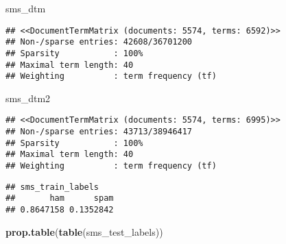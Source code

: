 \documentclass[]{article}
\newenvironment{Shaded}{\begin{snugshade}}{\end{snugshade}}
\newcommand{\KeywordTok}[1]{\textcolor[rgb]{0.13,0.29,0.53}{\textbf{#1}}}
\newcommand{\DecValTok}[1]{\textcolor[rgb]{0.00,0.00,0.81}{#1}}
\newcommand{\OperatorTok}[1]{\textcolor[rgb]{0.81,0.36,0.00}{\textbf{#1}}}
\newcommand{\NormalTok}[1]{#1}
\begin{document}
\begin{Shaded}
\begin{Highlighting}[]
\NormalTok{sms_dtm}
\end{Highlighting}
\end{Shaded}

\begin{verbatim}
## <<DocumentTermMatrix (documents: 5574, terms: 6592)>>
## Non-/sparse entries: 42608/36701200
## Sparsity           : 100%
## Maximal term length: 40
## Weighting          : term frequency (tf)
\end{verbatim}

\begin{Shaded}
\begin{Highlighting}[]
\NormalTok{sms_dtm2}
\end{Highlighting}
\end{Shaded}

\begin{verbatim}
## <<DocumentTermMatrix (documents: 5574, terms: 6995)>>
## Non-/sparse entries: 43713/38946417
## Sparsity           : 100%
## Maximal term length: 40
## Weighting          : term frequency (tf)
\end{verbatim}

\begin{Shaded}
\end{Shaded}

\begin{verbatim}
## sms_train_labels
##       ham      spam 
## 0.8647158 0.1352842
\end{verbatim}

\begin{Shaded}
\begin{Highlighting}[]
\KeywordTok{prop.table}\NormalTok{(}\KeywordTok{table}\NormalTok{(sms_test_labels))}
\end{Highlighting}
\end{Shaded}
\end{document}
